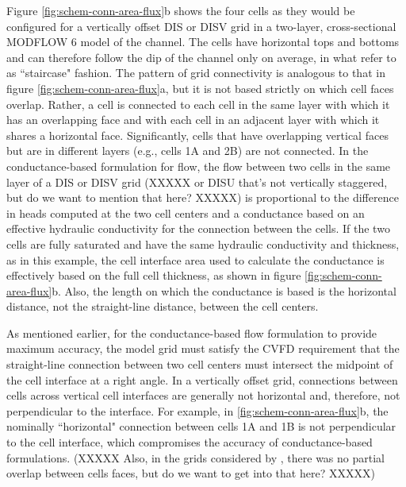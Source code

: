 \documentclass{article}
\begin{document}
Figure \ref{fig:schem-conn-area-flux}b shows the four cells as they would be configured for a vertically offset DIS or DISV grid in a two-layer, cross-sectional MODFLOW 6 model of the channel. The cells have horizontal tops and bottoms and can therefore follow the dip of the channel only on average, in what \cite{bardot2022} refer to as ``staircase" fashion. The pattern of grid connectivity is analogous to that in figure \ref{fig:schem-conn-area-flux}a, but it is not based strictly on which cell faces overlap. Rather, a cell is connected to each cell in the same layer with which it has an overlapping face and with each cell in an adjacent layer with which it shares a horizontal face. Significantly, cells that have overlapping vertical faces but are in different layers (e.g., cells 1A and 2B) are not connected. In the conductance-based formulation for flow, the flow between two cells in the same layer of a DIS or DISV grid (XXXXX or DISU that's not vertically staggered, but do we want to mention that here? XXXXX) is proportional to the difference in heads computed at the two cell centers and a conductance based on an effective hydraulic conductivity for the connection between the cells. If the two cells are fully saturated and have the same hydraulic conductivity and thickness, as in this example, the cell interface area used to calculate the conductance is effectively based on the full cell thickness, as shown in figure \ref{fig:schem-conn-area-flux}b. Also, the length on which the conductance is based is the horizontal distance, not the straight-line distance, between the cell centers.

As mentioned earlier, for the conductance-based flow formulation to provide maximum accuracy, the model grid must satisfy the CVFD requirement that the straight-line connection between two cell centers must intersect the midpoint of the cell interface at a right angle. In a vertically offset grid, connections between cells across vertical cell interfaces are generally not horizontal and, therefore, not perpendicular to the interface. For example, in \ref{fig:schem-conn-area-flux}b, the nominally ``horizontal" connection between cells 1A and 1B is not perpendicular to the cell interface, which compromises the accuracy of conductance-based formulations.  (XXXXX Also, in the grids considered by \cite{narasimhan1976integrated}, there was no partial overlap between cells faces, but do we want to get into that here? XXXXX)
\end{document}
